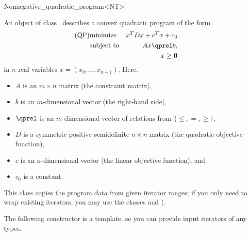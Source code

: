 \begin{ccRefClass}{Nonnegative_quadratic_program<NT>}


\ccDefinition
An object of class \ccRefName\ describes a convex quadratic program of the form
\begin{eqnarray*}
\mbox{(QP)}& \mbox{minimize} & x^{T}Dx+c^{T}x+c_0 \\
&\mbox{subject to}   & Ax\qprel b, \\
&                    & x \geq \mathbf{0}
\end{eqnarray*}
in $n$ real variables $x=(x_0,\ldots,x_{n-1})$.
Here, 
\begin{itemize}
\item $A$ is an $m\times n$ matrix (the constraint matrix), 
\item $b$ is an $m$-dimensional vector (the right-hand side),
\item $\qprel$ is an $m$-dimensional vector of relations 
from $\{\leq, =, \geq\}$, 
\item $D$ is a symmetric positive-semidefinite $n\times n$ matrix (the
  quadratic objective function),
\item $c$ is an $n$-dimensional vector (the linear objective
  function), and 
\item $c_0$ is a constant.
\end{itemize}

This class copies the program data from given iterator ranges; 
if you only need to wrap existing iterators, you may use the classes 
 and ).

\ccIsModel
{}

\ccCreation
\ccIndexClassCreation
{}

The following constructor is a template, so you can provide input
iterators of any types.


\ccSeeAlso
{}\\


\end{ccRefClass}
